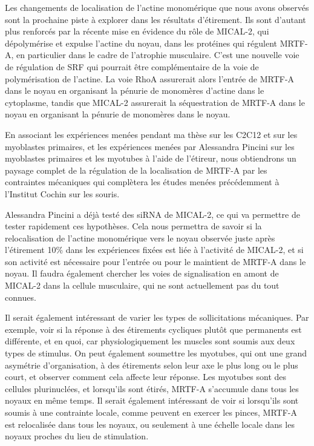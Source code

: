 Les changements de localisation de l'actine monomérique que nous avons observés sont la prochaine piste à explorer dans les résultats d'étirement. Ils sont d'autant plus renforcés par la récente mise en évidence du rôle de MICAL-2, qui dépolymérise et expulse l'actine du noyau, dans les protéines qui régulent MRTF-A, en particulier dans le cadre de l'atrophie musculaire. C'est une nouvelle voie de régulation de SRF qui pourrait être complémentaire de la voie de polymérisation de l'actine. La voie RhoA assurerait alors l'entrée de MRTF-A dans le noyau en organisant la pénurie de monomères d'actine dans le cytoplasme, tandis que MICAL-2 assurerait la séquestration de MRTF-A dans le noyau en organisant la pénurie de monomères dans le noyau. 

En associant les expériences menées pendant ma thèse sur les C2C12 et sur les myoblastes primaires, et les expériences menées par Alessandra Pincini sur les myoblastes primaires et les myotubes à l'aide de l'étireur, nous obtiendrons un paysage complet de la régulation de la localisation de MRTF-A par les contraintes mécaniques qui complètera les études menées précédemment à l'Institut Cochin sur les souris. 

Alessandra Pincini a déjà testé des siRNA de MICAL-2, ce qui va permettre de tester rapidement ces hypothèses. Cela nous permettra de savoir si la relocalisation de l'actine monomérique vers le noyau observée juste après l'étirement 10\% dans les expériences fixées est liée à l'activité de MICAL-2, et si son activité est nécessaire pour l'entrée ou pour le maintient de MRTF-A dans le noyau. 
Il faudra également chercher les voies de signalisation en amont de MICAL-2 dans la cellule musculaire, qui ne sont actuellement pas du tout connues. 

Il serait également intéressant de varier les types de sollicitations mécaniques. Par exemple, voir si la réponse à des étirements cycliques plutôt que permanents est différente, et en quoi, car physiologiquement les muscles sont soumis aux deux types de stimulus. On peut également soumettre les myotubes, qui ont une grand asymétrie d'organisation, à des étirements selon leur axe le plus long ou le plus court, et observer comment cela affecte leur réponse. Les myotubes sont des cellules plurinuclées, et lorsqu'ils sont étirés, MRTF-A s'accumule dans tous les noyaux en même temps. Il serait également intéressant de voir si lorsqu'ils sont soumis à une contrainte locale, comme peuvent en exercer les pinces, MRTF-A est relocalisée dans tous les noyaux, ou seulement à une échelle locale dans les noyaux proches du lieu de stimulation. 

